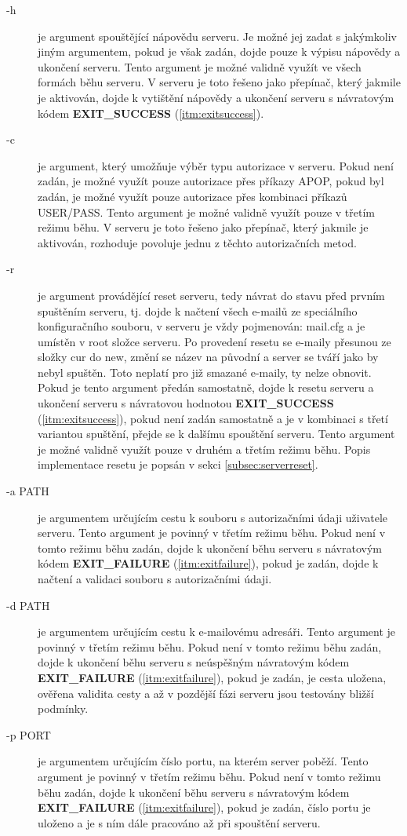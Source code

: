 \documentclass[11pt,a4paper]{report}
\begin{document}
    \begin{description}
        \item [-h] \label{itm:helpparam} je argument spouštějící nápovědu serveru. Je možné jej zadat s jakýmkoliv jiným argumentem, pokud je však zadán, dojde pouze k výpisu nápovědy a ukončení serveru. Tento argument je možné validně využít ve všech formách běhu serveru.
        V serveru je toto řešeno jako přepínač, který jakmile je aktivován, dojde k vytištění nápovědy a ukončení serveru s návratovým kódem \textbf{EXIT\_SUCCESS} (\ref{itm:exitsuccess}).
        \item [-c] \label{itm:authorisationparam}je argument, který umožňuje výběr typu autorizace v serveru. Pokud není zadán, je možné využít pouze autorizace přes příkazy APOP, pokud byl zadán, je možné využít pouze autorizace přes kombinaci příkazů USER/PASS. Tento argument je možné validně využít pouze v třetím režimu běhu.
        V serveru je toto řešeno jako přepínač, který jakmile je aktivován, rozhoduje povoluje jednu z těchto autorizačních metod.
        \item [-r] \label{itm:resetparam}je argument provádějící reset serveru, tedy návrat do stavu před prvním spuštěním serveru, tj. dojde k načtení všech e-mailů ze speciálního konfiguračního souboru, v serveru je vždy pojmenován: mail.cfg a je umístěn v root složce serveru. Po provedení resetu se e-maily přesunou ze složky cur do new, změní se název na původní a server se tváří jako by nebyl spuštěn. Toto neplatí pro již smazané e-maily, ty nelze obnovit. Pokud je tento argument předán samostatně, dojde k resetu serveru a ukončení serveru s návratovou hodnotou \textbf{EXIT\_SUCCESS} (\ref{itm:exitsuccess}), pokud není zadán samostatně a je v kombinaci s třetí variantou spuštění, přejde se k dalšímu spouštění serveru. Tento argument je možné validně využít pouze v druhém a třetím režimu běhu. Popis implementace resetu je popsán v sekci \ref{subsec:serverreset}.
        \item [-a PATH] je argumentem určujícím cestu k souboru s autorizačními údaji uživatele serveru. Tento argument je povinný v třetím režimu běhu. Pokud není v tomto režimu běhu zadán, dojde k ukončení běhu serveru s návratovým kódem \textbf{EXIT\_FAILURE} (\ref{itm:exitfailure}), pokud je zadán, dojde k načtení a validaci souboru s autorizačními údaji.
        \item [-d PATH] je argumentem určujícím cestu k e-mailovému adresáři. Tento argument je povinný v třetím režimu běhu. Pokud není v tomto režimu běhu zadán, dojde k ukončení běhu serveru s neúspěšným návratovým kódem \textbf{EXIT\_FAILURE} (\ref{itm:exitfailure}), pokud je zadán, je cesta uložena, ověřena validita cesty a až v pozdější fázi serveru jsou testovány bližší podmínky.
        \item [-p PORT] je argumentem určujícím číslo portu, na kterém server poběží. Tento argument je povinný v třetím režimu běhu. Pokud není v tomto režimu běhu zadán, dojde k ukončení běhu serveru s návratovým kódem \textbf{EXIT\_FAILURE} (\ref{itm:exitfailure}), pokud je zadán, číslo portu je uloženo a je s ním dále pracováno až při spouštění serveru.
    \end{description}
\end{document}
